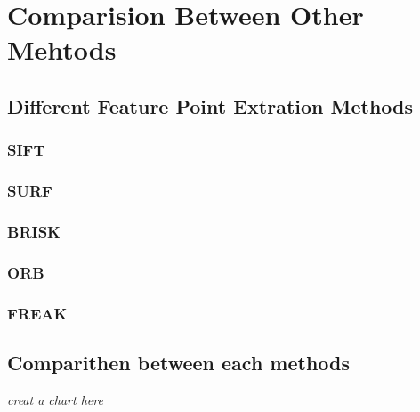 \chapter{Comparision Between Other Mehtods}
\label{c:comparision}

\section{Different Feature Point Extration Methods}
\subsection{SIFT}
\subsection{SURF}
\subsection{BRISK}
\subsection{ORB}
\subsection{FREAK}

\section{Comparithen between each methods}
\emph{creat a chart here}